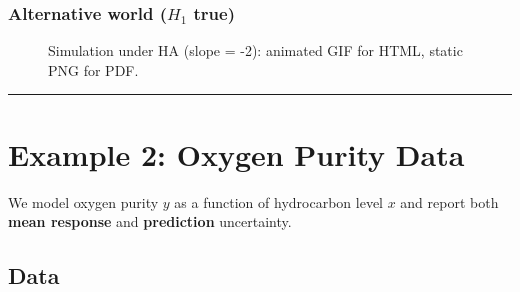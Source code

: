 \documentclass[
  letterpaper,
]{scrbook}
\begin{document}
\subsubsection{\texorpdfstring{Alternative world (\(H_1\)
true)}{Alternative world (H\_1 true)}}\label{alternative-world-h_1-true}

\begin{figure}


\caption{\label{fig-simulation-HA}Simulation under HA (slope = -2):
animated GIF for HTML, static PNG for PDF.}

\end{figure}%

\begin{center}\rule{0.5\linewidth}{0.5pt}\end{center}

\section{Example 2: Oxygen Purity
Data}\label{example-2-oxygen-purity-data}

We model oxygen purity \(y\) as a function of hydrocarbon level \(x\)
and report both \textbf{mean response} and \textbf{prediction}
uncertainty.

\subsection{Data}\label{data}
\end{document}
